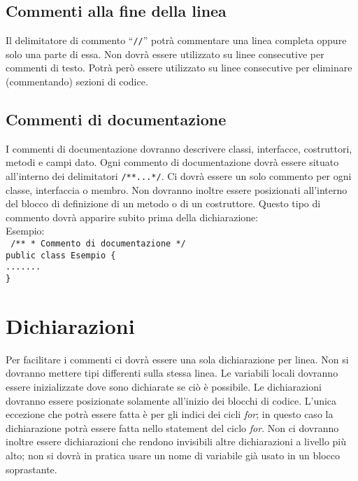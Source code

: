 \subsection{Commenti alla fine della linea}
Il delimitatore di commento ``\texttt{//}'' potr\`a commentare una linea completa oppure solo una parte di essa. Non dovr\`a essere utilizzato su linee consecutive per commenti di testo. Potr\`a per\`o essere utilizzato su linee consecutive per eliminare (commentando) sezioni di codice.
\subsection{Commenti di documentazione}
I commenti di documentazione dovranno descrivere classi, interfacce, costruttori, metodi e campi dato. Ogni commento di documentazione dovr\`a essere situato all'interno dei delimitatori \texttt{/**...*/}. Ci dovr\`a essere un solo commento per ogni classe, interfaccia o membro. Non dovranno inoltre essere posizionati all'interno del blocco di definizione di un metodo o di un costruttore. Questo tipo di commento dovr\`a apparire subito prima della dichiarazione:\\
 \newline
Esempio:\\
 \newline
\texttt{
	/** \newline
	* Commento di documentazione \newline
	*/ \\
	public class Esempio \{ \\
	\phantom{....}....... \\
	\}
	\\
}
 \newline
\section{Dichiarazioni}
Per facilitare i commenti ci dovr\`a essere una sola dichiarazione per linea. Non si dovranno mettere tipi differenti sulla stessa linea. Le variabili locali dovranno essere inizializzate dove sono dichiarate se ci\`o \`e possibile. Le dichiarazioni dovranno essere posizionate solamente all'inizio dei blocchi di codice. L'unica eccezione che potr\`a essere fatta è per gli indici dei cicli \textit{for}; in questo caso la dichiarazione potr\`a essere fatta nello statement del ciclo \textit{for}. Non ci dovranno inoltre essere dichiarazioni che rendono invisibili altre dichiarazioni a livello pi\`u alto; non si dovr\`a in pratica usare un nome di variabile gi\`a usato in un blocco soprastante.

